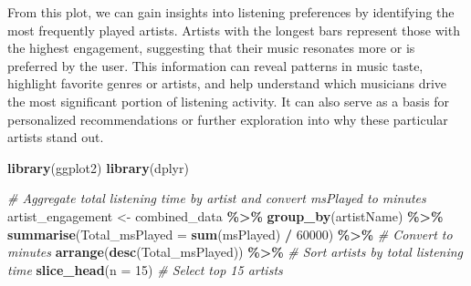 \documentclass[
]{article}
\newenvironment{Shaded}{\begin{snugshade}}{\end{snugshade}}
\newcommand{\AttributeTok}[1]{\textcolor[rgb]{0.13,0.29,0.53}{#1}}
\newcommand{\CommentTok}[1]{\textcolor[rgb]{0.56,0.35,0.01}{\textit{#1}}}
\newcommand{\DecValTok}[1]{\textcolor[rgb]{0.00,0.00,0.81}{#1}}
\newcommand{\FunctionTok}[1]{\textcolor[rgb]{0.13,0.29,0.53}{\textbf{#1}}}
\newcommand{\NormalTok}[1]{#1}
\newcommand{\OtherTok}[1]{\textcolor[rgb]{0.56,0.35,0.01}{#1}}
\newcommand{\SpecialCharTok}[1]{\textcolor[rgb]{0.81,0.36,0.00}{\textbf{#1}}}
\begin{document}
From this plot, we can gain insights into listening preferences by
identifying the most frequently played artists. Artists with the longest
bars represent those with the highest engagement, suggesting that their
music resonates more or is preferred by the user. This information can
reveal patterns in music taste, highlight favorite genres or artists,
and help understand which musicians drive the most significant portion
of listening activity. It can also serve as a basis for personalized
recommendations or further exploration into why these particular artists
stand out.

\begin{Shaded}
\begin{Highlighting}[]
\FunctionTok{library}\NormalTok{(ggplot2)}
\FunctionTok{library}\NormalTok{(dplyr)}

\CommentTok{\# Aggregate total listening time by artist and convert msPlayed to minutes}
\NormalTok{artist\_engagement }\OtherTok{\textless{}{-}}\NormalTok{ combined\_data }\SpecialCharTok{\%\textgreater{}\%}
  \FunctionTok{group\_by}\NormalTok{(artistName) }\SpecialCharTok{\%\textgreater{}\%}
  \FunctionTok{summarise}\NormalTok{(}\AttributeTok{Total\_msPlayed =} \FunctionTok{sum}\NormalTok{(msPlayed) }\SpecialCharTok{/} \DecValTok{60000}\NormalTok{) }\SpecialCharTok{\%\textgreater{}\%}  \CommentTok{\# Convert to minutes}
  \FunctionTok{arrange}\NormalTok{(}\FunctionTok{desc}\NormalTok{(Total\_msPlayed)) }\SpecialCharTok{\%\textgreater{}\%}  \CommentTok{\# Sort artists by total listening time}
  \FunctionTok{slice\_head}\NormalTok{(}\AttributeTok{n =} \DecValTok{15}\NormalTok{)  }\CommentTok{\# Select top 15 artists}


\end{Highlighting}
\end{Shaded}
\end{document}
